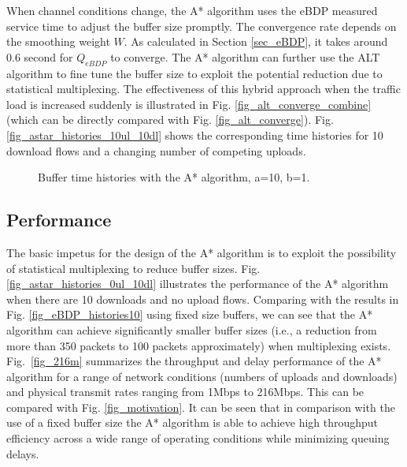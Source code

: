 \documentclass[10pt,twocolumn, journal]{IEEEtran}
\begin{document}
When channel conditions change, the A* algorithm uses the eBDP measured service
time to adjust the buffer size promptly. The convergence rate depends on the smoothing
weight $W$. As calculated in Section \ref{sec_eBDP}, it takes around 0.6 second for
$Q_{eBDP}$ to converge. The A* algorithm can further use the ALT algorithm to fine tune
the buffer size to exploit the potential reduction due to statistical multiplexing. The
effectiveness of this hybrid approach when the traffic load is increased suddenly is
illustrated in Fig. \ref{fig_alt_converge_combine} (which can be directly compared with Fig. \ref{fig_alt_converge}).   Fig. \ref{fig_astar_histories_10ul_10dl} shows the corresponding time histories for 10 download flows and a changing number of competing uploads.

\begin{figure}[tb]
   \centering
   \caption{Buffer time histories with the A* algorithm, a=10, b=1.}
   \label{fig_astar_histories}
\end{figure}

\subsection{Performance}\label{subsec_performance}

The basic impetus for the design of the A* algorithm is to exploit the
possibility of statistical multiplexing to reduce buffer sizes. Fig.
\ref{fig_astar_histories_0ul_10dl} illustrates the performance of the A* algorithm when there are
10 downloads and no upload flows.  Comparing with the results in Fig.
\ref{fig_eBDP_histories10} using fixed size buffers, we can see that the A* algorithm can
achieve significantly smaller buffer sizes (i.e., a reduction from more than 350 packets to 100
packets approximately) when multiplexing exists.  Fig.~\ref{fig_216m} summarizes the throughput and delay performance of the A* algorithm for a range of network conditions (numbers of uploads and downloads) and physical transmit rates ranging from  1Mbps to 216Mbps.  This can be compared with Fig. \ref{fig_motivation}.  It can be seen that in comparison with the use of a fixed buffer size the A* algorithm is able to achieve high throughput efficiency across a wide range of operating conditions while minimizing queuing delays.
\end{document}
